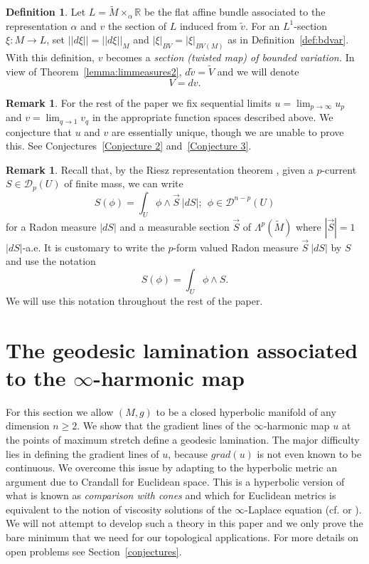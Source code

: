 \documentclass{ip-journal}
\theoremstyle{definition}
\newtheorem{definition}[theorem]{Definition}
\newtheorem{remark}[theorem]{Remark}
\numberwithin{equation}{section}
\newcommand{\R}{\mathbb R}
\begin{document}
\begin{definition} Let $ L=\tilde M \times_\alpha \R$ be the flat affine bundle associated to the representation $\alpha$ and $v$  the section of  $ L$ induced from $\tilde v$. For an $L^1$-section $\xi: M \rightarrow L$, set $||d\xi||=||d\xi||_M$ and $|\xi|_{BV}=|\xi|_{BV(M)}$ as in Definition~\ref{def:bdvar}.  
 With this definition, $v$ becomes a  {\it section (twisted map) of bounded variation. } 
In view of Theorem~\ref{lemma:limmeasures2}, $d \tilde v=\tilde V$ and we  will denote
\[
V=dv.
\]
\end{definition}
\begin{remark}For the rest of the paper we fix sequential limits $u=\lim_{p \rightarrow \infty} u_p$ and $v=\lim_{q \rightarrow 1} v_q$ in the appropriate function spaces described above. We conjecture that $u$ and $v$ are essentially unique, though we are unable to prove this. See Conjectures~\ref{Conjecture 2} and~\ref{Conjecture 3}.
\end{remark} 

\begin{remark}\label{radonms}
Recall that, by the Riesz representation theorem \cite[Chapter 6, (2.14)]{simon},   given a $p$-current $S \in \mathcal D_p (U)$ of finite mass,
we can write
\[
S(\phi)=\int_{ U} \phi \wedge \vec {S} \ |dS|; \ \ \phi \in \mathcal D^{n-p} ( U) 
\]
for a Radon measure $|d S|$ and a measurable section $ \vec {S}$ of $\Lambda^p(\tilde M)$  where
$| \vec {S}|=1$ $|d S|$-a.e. It is customary to write the $p$-form valued Radon measure $\vec {S} \ |dS|$ by $S$ and use the notation
\[
S(\phi)=\int_{ U} \phi \wedge S.
\]
We will use this notation throughout the rest of the paper.
\end{remark}

\section{The geodesic lamination associated to the $\infty$-harmonic map}\label{sect:crandal}
For this section we allow $(M, g)$ to be a closed hyperbolic manifold of any dimension $n \geq 2$. We show that the gradient lines of the $\infty$-harmonic map $u$ at the points of maximum stretch define a geodesic lamination. The major difficulty lies in defining the gradient lines of $u$, because $grad(u)$ is not even known to be continuous.  We overcome this issue by adapting to the hyperbolic metric an argument due to Crandall for Euclidean space. This is a hyperbolic version of what is known as {\it{comparison with cones}} and which for Euclidean metrics is  equivalent to the notion of viscosity solutions of the $\infty$-Laplace equation (cf. \cite{crandal} or \cite{lindqvist}). We will not attempt to develop such a theory in this paper and we only prove the bare minimum that we need for our topological applications. For more details on open problems see Section~\ref{conjectures}.
\end{document}
